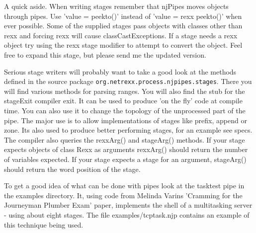 A quick aside.  When writing stages remember that njPipes moves objects through pipes.  Use 'value = peekto()' instead of 'value = rexx peekto()' when ever possible.  Some of the supplied stages pass objects with classes other than rexx and forcing rexx will cause classCastExceptions. If a stage needs a rexx object try using the rexx stage modifier to attempt to convert the object.  Feel free to expand this stage, but please send me the updated version.

Serious stage writers will probably want to take a good look at the
methods defined in the \nr{} source package \texttt{org.netrexx.process.njpipes.stages}.  There you will find various methods for parsing ranges.  You will also find the stub for the stageExit compiler exit.  It can be used to produce 'on the fly' code at compile time.  You can also use it to change the topology of the unprocessed part of the pipe.  The major use is to allow implementations of stages like prefix, append or zone.  Its also used to produce better performing stages, for an example see specs.
The compiler also queries the rexxArg() and stageArg() methods.  If your stage expects objects of class Rexx as arguments rexxArg() should return the number of variables expected.  If your stage expects a stage for an argument, stageArg() should return the word position of the stage.

To get a good idea of what can be done with pipes look at the tasktest pipe in the examples directory.  It, using code from Melinda Varins 'Cramming for the Journeyman Plumber Exam' paper,  implements the shell of a  multitasking server - using about eight stages.  The file examples/tcptask.njp contains an example of this technique being used.

